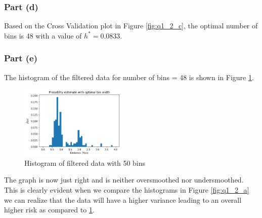\subsubsection{Part (d)}

Based on the Cross Validation plot in Figure \ref{fig:q1_2_c}, the optimal number of bins is 48 with a value of $h^\ast = 0.0833$.

\subsubsection{Part (e)}

The histogram of the filtered data for number of bins = 48 is shown in Figure \ref{fig:q1_2_e}.

\begin{figure}[H]
    \centering
    \includegraphics[width=0.45\textwidth]{../q1/images/optimalhistogram.png}
    \caption{Histogram of filtered data with 50 bins}
    \label{fig:q1_2_e}
\end{figure}

\hspace{-16pt}The graph is now just right and is neither oversmoothed nor undersmoothed. This is clearly evident when we compare the histograms in Figure \ref{fig:q1_2_a} we can realize that the data will have a higher variance leading to an overall higher risk as compared to \ref{fig:q1_2_e}.
\newpage
